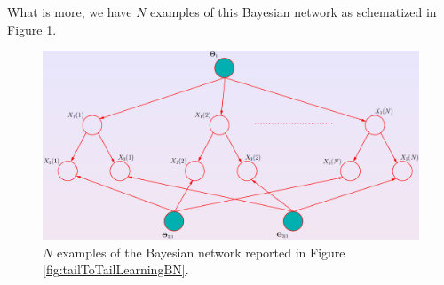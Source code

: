 What is more, we have $N$ examples of this Bayesian network as schematized in
Figure \ref{fig:learningBNExample1}.

\begin{figure}[H]
	\centering
	\includegraphics[width=\textwidth]{
		images/10_BayesianNetworksLearning_exampleLearning1.png
	}
	\caption{$N$ examples of the Bayesian network reported in Figure
	\ref{fig:tailToTailLearningBN}.}
	\label{fig:learningBNExample1}
\end{figure}

